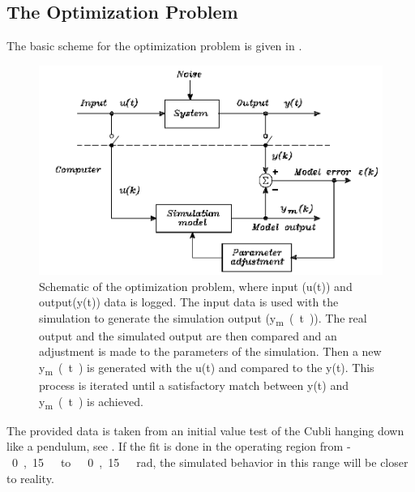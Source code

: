 \subsection{The Optimization Problem}
The basic scheme for the optimization problem is given in .
%
\begin{figure}[H]
	\centering
	\includegraphics[scale=0.4]{figures/SensToolSchema}
%	
	\caption{Schematic of the optimization problem, where input (u(t)) and output(y(t)) data is logged. The input data is used with the simulation to generate the simulation output (\si{y_{m}(t)}). The real output and the simulated output are then compared and an adjustment is made to the parameters of the simulation. Then a new \si{y_{m}(t)} is generated with the u(t) and compared to the y(t). This process is iterated until a satisfactory match between y(t) and \si{y_{m}(t)} is achieved\cite{Senstools}.}
	\label{SensToolSchema}
\end{figure}
%
The provided data is taken from an initial value test of the Cubli hanging down like a pendulum, see .
If the fit is done in the operating region from \si{-0,15\ to\ 0,15\ rad}, the simulated behavior in this range will be closer to reality.

